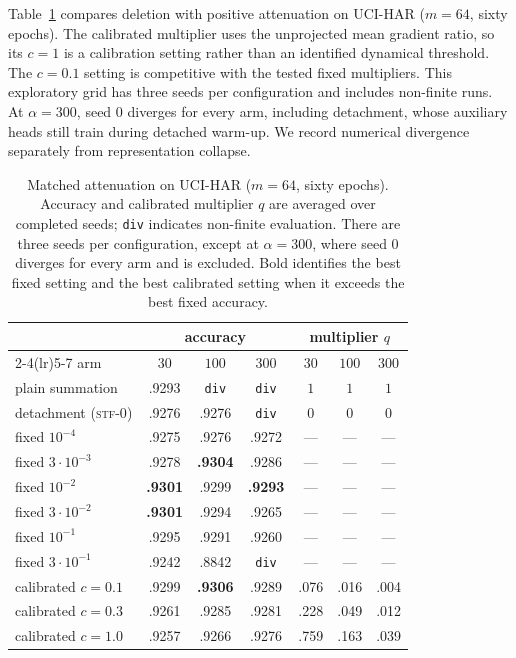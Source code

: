 \documentclass{article}
\begin{document}
Table~\ref{tab:attenuation} compares deletion with positive attenuation on UCI-HAR ($m=64$, sixty epochs). The calibrated multiplier uses the unprojected mean gradient ratio, so its $c=1$ is a calibration setting rather than an identified dynamical threshold. The $c=0.1$ setting is competitive with the tested fixed multipliers. This exploratory grid has three seeds per configuration and includes non-finite runs. At $\alpha=300$, seed $0$ diverges for every arm, including detachment, whose auxiliary heads still train during detached warm-up. We record numerical divergence separately from representation collapse.

\begin{table}[h]
\centering
\caption{Matched attenuation on UCI-HAR ($m=64$, sixty epochs). Accuracy and calibrated multiplier $q$ are averaged over completed seeds; \texttt{div} indicates non-finite evaluation. There are three seeds per configuration, except at $\alpha=300$, where seed $0$ diverges for every arm and is excluded. Bold identifies the best fixed setting and the best calibrated setting when it exceeds the best fixed accuracy.}
\label{tab:attenuation}
\footnotesize
\begin{tabular}{lcccccc}
\toprule
& \multicolumn{3}{c}{accuracy} & \multicolumn{3}{c}{multiplier $q$} \\
\cmidrule(lr){2-4}\cmidrule(lr){5-7}
arm & $30$ & $100$ & $300$ & $30$ & $100$ & $300$ \\
\midrule
plain summation & .9293 & \texttt{div} & \texttt{div} & $1$ & $1$ & $1$ \\
detachment (\textsc{stf-0}) & .9276 & .9276 & \texttt{div} & $0$ & $0$ & $0$ \\
fixed $10^{-4}$ & .9275 & .9276 & .9272 & --- & --- & --- \\
fixed $3{\cdot}10^{-3}$ & .9278 & \textbf{.9304} & .9286 & --- & --- & --- \\
fixed $10^{-2}$ & \textbf{.9301} & .9299 & \textbf{.9293} & --- & --- & --- \\
fixed $3{\cdot}10^{-2}$ & \textbf{.9301} & .9294 & .9265 & --- & --- & --- \\
fixed $10^{-1}$ & .9295 & .9291 & .9260 & --- & --- & --- \\
fixed $3{\cdot}10^{-1}$ & .9242 & .8842 & \texttt{div} & --- & --- & --- \\
calibrated $c=0.1$ & .9299 & \textbf{.9306} & .9289 & .076 & .016 & .004 \\
calibrated $c=0.3$ & .9261 & .9285 & .9281 & .228 & .049 & .012 \\
calibrated $c=1.0$ & .9257 & .9266 & .9276 & .759 & .163 & .039 \\
\bottomrule
\end{tabular}
\end{table}
\end{document}
